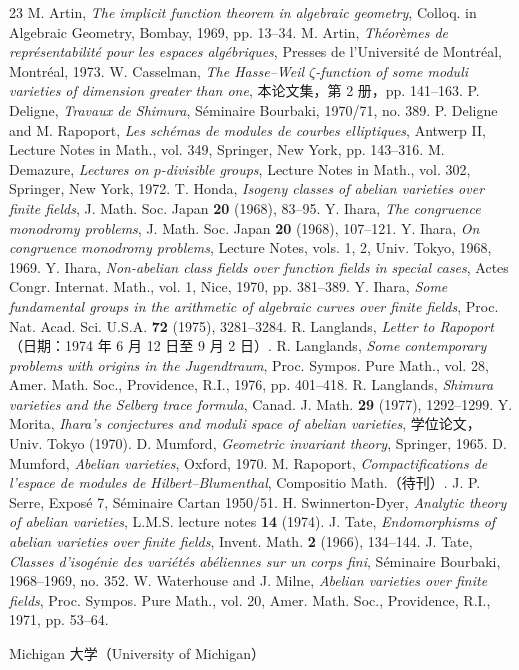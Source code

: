 \begin{thebibliography}{23}
 M. Artin, \emph{The implicit function theorem in algebraic geometry}, Colloq. in Algebraic Geometry, Bombay, 1969, pp. 13--34.
 M. Artin, \emph{Th\'eor\`emes de repr\'esentabilit\'e pour les espaces alg\'ebriques}, Presses de l'Universit\'e de Montr\'eal, Montr\'eal, 1973.
 W. Casselman, \emph{The Hasse--Weil $\zeta$-function of some moduli varieties of dimension greater than one}, 本论文集，第 2 册，pp. 141--163.
 P. Deligne, \emph{Travaux de Shimura}, S\'eminaire Bourbaki, 1970/71, no. 389.
 P. Deligne and M. Rapoport, \emph{Les sch\'emas de modules de courbes elliptiques}, Antwerp II, Lecture Notes in Math., vol. 349, Springer, New York, pp. 143--316.
 M. Demazure, \emph{Lectures on $p$-divisible groups}, Lecture Notes in Math., vol. 302, Springer, New York, 1972.
 T. Honda, \emph{Isogeny classes of abelian varieties over finite fields}, J. Math. Soc. Japan \textbf{20} (1968), 83--95.
 Y. Ihara, \emph{The congruence monodromy problems}, J. Math. Soc. Japan \textbf{20} (1968), 107--121.
 Y. Ihara, \emph{On congruence monodromy problems}, Lecture Notes, vols. 1, 2, Univ. Tokyo, 1968, 1969.
 Y. Ihara, \emph{Non-abelian class fields over function fields in special cases}, Actes Congr. Internat. Math., vol. 1, Nice, 1970, pp. 381--389.
 Y. Ihara, \emph{Some fundamental groups in the arithmetic of algebraic curves over finite fields}, Proc. Nat. Acad. Sci. U.S.A. \textbf{72} (1975), 3281--3284.
 R. Langlands, \emph{Letter to Rapoport}（日期：1974 年 6 月 12 日至 9 月 2 日）.
 R. Langlands, \emph{Some contemporary problems with origins in the Jugendtraum}, Proc. Sympos. Pure Math., vol. 28, Amer. Math. Soc., Providence, R.I., 1976, pp. 401--418.
 R. Langlands, \emph{Shimura varieties and the Selberg trace formula}, Canad. J. Math. \textbf{29} (1977), 1292--1299.
 Y. Morita, \emph{Ihara's conjectures and moduli space of abelian varieties}, 学位论文，Univ. Tokyo (1970).
 D. Mumford, \emph{Geometric invariant theory}, Springer, 1965.
 D. Mumford, \emph{Abelian varieties}, Oxford, 1970.
 M. Rapoport, \emph{Compactifications de l'espace de modules de Hilbert--Blumenthal}, Compositio Math.（待刊）.
 J. P. Serre, Expos\'e 7, S\'eminaire Cartan 1950/51.
 H. Swinnerton-Dyer, \emph{Analytic theory of abelian varieties}, L.M.S. lecture notes \textbf{14} (1974).
 J. Tate, \emph{Endomorphisms of abelian varieties over finite fields}, Invent. Math. \textbf{2} (1966), 134--144.
 J. Tate, \emph{Classes d'isog\'enie des vari\'et\'es ab\'eliennes sur un corps fini}, S\'eminaire Bourbaki, 1968--1969, no. 352.
 W. Waterhouse and J. Milne, \emph{Abelian varieties over finite fields}, Proc. Sympos. Pure Math., vol. 20, Amer. Math. Soc., Providence, R.I., 1971, pp. 53--64.
\end{thebibliography}
\begin{flushright}Michigan 大学（University of Michigan）\end{flushright}

